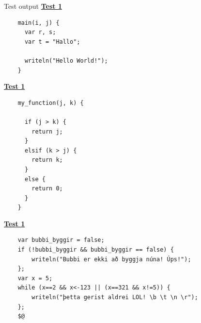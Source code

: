 \documentclass{homework}
\begin{document}
\begin{question}{Test output}
  \textbf{\underline{Test 1}}
  \begin{verbatim}
    main(i, j) {
      var r, s;
      var t = "Hallo";

      writeln("Hello World!");
    }
  \end{verbatim}
  \textbf{\underline{Test 1}}
  \begin{verbatim}
    my_function(j, k) {

      if (j > k) {
        return j;
      }
      elsif (k > j) {
        return k;
      }
      else {
        return 0;
      }
    }
  \end{verbatim}
  \textbf{\underline{Test 1}}
  \begin{verbatim}
    var bubbi_byggir = false;
    if (!bubbi_byggir && bubbi_byggir == false) {
    	writeln("Bubbi er ekki að byggja núna! Úps!");
    };
    var x = 5;
    while (x==2 && x<-123 || (x==321 && x!=5)) {
    	writeln("þetta gerist aldrei LOL! \b \t \n \r");
    };
    $@
  \end{verbatim}
\end{question}
\end{document}
